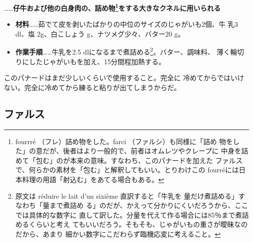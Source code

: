 \begin{recette}


\ldots{}\ldots{}\textbf{仔牛および他の白身肉の、詰め物\footnote{fourrré
  （フレ）詰め物をした。farci （ファルシ）も同様に「詰め
  物をした」の意だが、後者はより一般的で、前者はオムレツやクレープに
  中身を詰めて「包む」のが本来の意味。すなわち、このパナードを加えた
  ファルスで、何らかの素材を「包む」と解釈してもいい。とりわけこの
  fourréには日本料理の用語「射込む」をあてる場合もある。}をする大きなクネルに用いられる}

\begin{itemize}
\item
  \textbf{材料}\ldots{}\ldots{}茹でて皮を剥いたばかりの中位のサイズのじゃがいも2個、牛
  乳3 dl、塩 2g、白こしょう\undemi{} g、ナツメグ少々、バター20 g。
\item
  \textbf{作業手順}\ldots{}\ldots{}牛乳を2.5
  dlになるまで煮詰める\footnote{原文は réduire le lait d'un sixième
    直訳すると「牛乳を
    \unsixieme{}量だけ煮詰める」すなわち「\cinqsixiemes{}量まで煮詰め
    る」のだが、かえって分かりにくいだろうから、ここでは具体的な数字に
    直して訳した。分量を代えて作る場合には85％まで煮詰めるくらいと考え
    てもいいだろう。そもそも、じゃがいもの重さが曖昧なのだから、あまり
    細かい数字にこだわらず臨機応変に考えること。}。バター、調味料、
  薄く輪切りにしたじゃがいもを加え、15分間程加熱する。
\end{itemize}

このパナードはまだ少しいくらいで使用すること。完全に
冷めてからではいけない。完全に冷めてから練ると粘りが出てしまうからだ。
\end{recette}
\hypertarget{farces}{%
\subsection{ファルス}\label{farces}}


 

